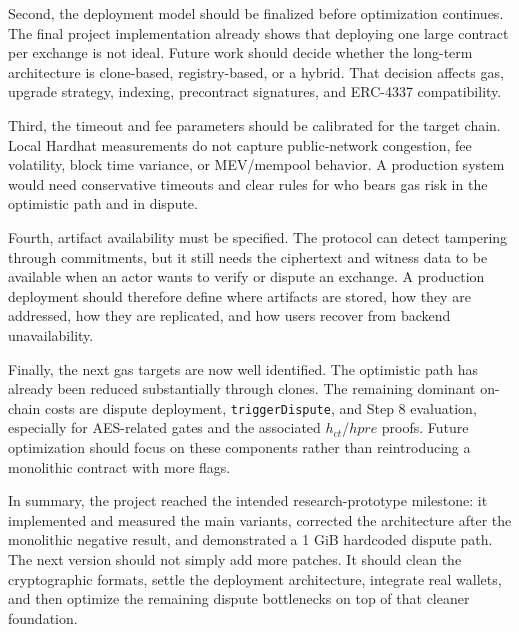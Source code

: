 Second, the deployment model should be finalized before optimization continues. The final
project implementation already shows that deploying one large contract per exchange is not
ideal. Future work should decide whether the long-term architecture is clone-based,
registry-based, or a hybrid. That decision affects gas, upgrade strategy, indexing,
precontract signatures, and ERC-4337 compatibility.

Third, the timeout and fee parameters should be calibrated for the target chain. Local
Hardhat measurements do not capture public-network congestion, fee volatility, block time
variance, or MEV/mempool behavior. A production system would need conservative timeouts and
clear rules for who bears gas risk in the optimistic path and in dispute.

Fourth, artifact availability must be specified. The protocol can detect tampering through
commitments, but it still needs the ciphertext and witness data to be available when an
actor wants to verify or dispute an exchange. A production deployment should therefore
define where artifacts are stored, how they are addressed, how they are replicated, and how
users recover from backend unavailability.

Finally, the next gas targets are now well identified. The optimistic path has already been
reduced substantially through clones. The remaining dominant on-chain costs are dispute
deployment, \texttt{triggerDispute}, and Step 8 evaluation, especially for AES-related gates
and the associated \(h_{\mathit{ct}}\)/\(hpre\) proofs. Future optimization should focus on
these components rather than reintroducing a monolithic contract with more flags.

In summary, the project reached the intended research-prototype milestone: it implemented
and measured the main variants, corrected the architecture after the monolithic negative
result, and demonstrated a 1 GiB hardcoded dispute path. The next version should not simply
add more patches. It should clean the cryptographic formats, settle the deployment
architecture, integrate real wallets, and then optimize the remaining dispute bottlenecks
on top of that cleaner foundation.
